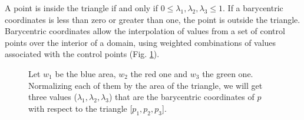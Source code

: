 A point is inside the triangle if and only if $0 \leq \lambda_1, \lambda_2, \lambda_3 \leq 1$. If a barycentric coordinates is less than zero or greater than one, the point is outside the triangle.
Barycentric coordinates allow the interpolation of values from a set of control points over the interior of a domain, using weighted combinations of values associated with the control points (Fig. \ref{fig:barycentric-coord}).
\cite{REPORT:localbarycentricoordsepfl}
\begin{figure}
  \centering
    \caption{Let $w_1$ be the blue area, $w_2$ the red one and $w_3$ the green one. Normalizing each of them by the area of the triangle, we will get three values ($\lambda_1, \lambda_2, \lambda_3$) that are the barycentric coordinates of $p$ with respect to the triangle [$p_1, p_2, p_3$].}
    \label{fig:barycentric-coord}
  \end{figure}


